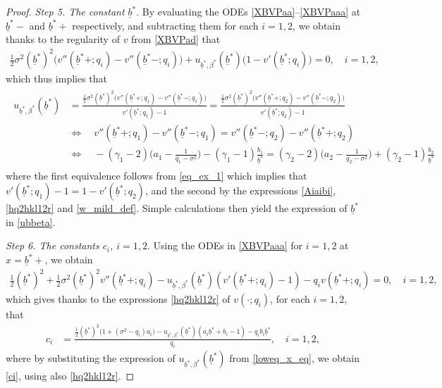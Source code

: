 \documentclass[10pt,a4paper]{amsart}
\def\ub{\underline{b}}
\begin{document}
\begin{proof}
\vspace{1mm}
{\it Step 5. The constant $\ub^*$}.
By evaluating the ODEs \eqref{XBVPaa}--\eqref{XBVPaaa} at $\ub^*-$ and $\ub^*+$ respectively, and subtracting them for each $i=1,2$, we obtain thanks to the regularity of $v$ from \eqref{XBVPad} that
\begin{align} \label{eq:premub}
\tfrac12 \sigma^2 (\ub^*)^2 \big(v''(\ub^*+;q_i) - v''(\ub^*-;q_i) \big) + u_{\ub^*,\beta^*}(\ub^*) \big(1 - v'(\ub^*;q_i)\big) = 0 
, \quad i=1,2,
\end{align}
which thus implies that 
\begin{align}
\begin{split}
u_{\ub^*,\beta^*}(\ub^*) 
&= \frac{\tfrac12 \sigma^2 (\ub^*)^2 \big(v''(\ub^*+;q_1) - v''(\ub^*-;q_1) \big)}{v'(\ub^*;q_1) - 1} 
= \frac{\tfrac12 \sigma^2 (\ub^*)^2 \big(v''(\ub^*+;q_2) - v''(\ub^*-;q_2) \big)}{v'(\ub^*;q_2) - 1} \\
&\Leftrightarrow \quad 
v''(\ub^*+;q_1) - v''(\ub^*-;q_1) = v''(\ub^*-;q_2) - v''(\ub^*+;q_2) \\
&\Leftrightarrow \quad 
-(\gamma_1 - 2) \Big(a_1 -\frac{1}{q_1-\sigma^2}\Big) - (\gamma_1 - 1) \frac{b_1}{\ub^*} = (\gamma_2 - 2) \Big(a_2 -\frac{1}{q_2-\sigma^2}\Big) + (\gamma_2 - 1) \frac{b_2}{\ub^*} 
\end{split}
\label{loweq_x_eq}
\end{align}
where the first equivalence follows from \eqref{eq_ex_1} which implies that $v'(\ub^*;q_1) - 1 = 1 - v'(\ub^*;q_2)$, and the second by the expressions \eqref{Aiaibi}, \eqref{hq2hkl12r} and \eqref{w_mild_def}. Simple calculations then yield the expression of $\ub^*$ in \eqref{ubbeta}.

\vspace{1mm}
{\it Step 6. The constants $c_i$, $i=1,2$}. 
Using the ODEs in \eqref{XBVPaaa} for $i=1,2$ at $x=\ub^*+$, we obtain 
\begin{align*}
\tfrac12 (\ub^*)^2 + \tfrac12 \sigma^2 (\ub^*)^2 v''(\ub^*+;q_i) - u_{\ub^*,\beta^*}(\ub^*) (v'(\ub^*+;q_i) - 1) - q_i v(\ub^*+;q_i) = 0, \quad i=1,2,  
\end{align*}
which gives thanks to the expressions \eqref{hq2hkl12r} of $v(\cdot;q_i)$, for each $i=1,2$, that 
\begin{align*}
c_i 
&= \frac{\tfrac12 (\ub^*)^2 \big(1 + (\sigma^2 - q_i) a_i \big) - u_{\ub^*,\beta^*}(\ub^*) (a_i \ub^* + b_i - 1) - q_i b_i \ub^*}{q_i} 
, \quad i=1,2,
\end{align*}
where by substituting the expression of $u_{\ub^*,\beta^*}(\ub^*)$ from \eqref{loweq_x_eq}, we obtain \eqref{ci}, using also \eqref{hq2hkl12r}. 


\end{proof}
\end{document}

